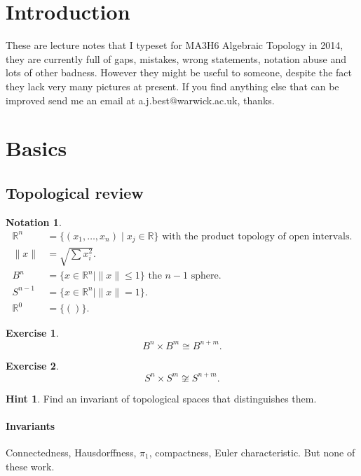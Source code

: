 \documentclass{article}
\theoremstyle{definition}
\newtheorem*{exer}{Exercise}
\newtheorem*{nota}{Notation}
\newtheorem*{hint}{Hint}
\newcommand{\RR}{\mathbb{R}}
\begin{document}
\maketitle
\tableofcontents

\section{Introduction}
These are lecture notes that I typeset for MA3H6 Algebraic Topology in 2014, they are currently full of gaps, mistakes, wrong statements, notation abuse and lots of other badness.
However they might be useful to someone, despite the fact they lack very many pictures at present.
If you find anything else that can be improved send me an email at a.j.best@warwick.ac.uk, thanks.
\clearpage

\section{Basics}
\subsection{Topological review}

\begin{nota}
\begin{align*}
\RR^n &= \{(x_1, \ldots,x_n)\mid x_j\in\RR\}\text{ with the product topology of open intervals}.\\
\|x\| &= \sqrt{\sum x_i^2}.\\
B^n &= \{x\in \RR^n \mid \|x\| \le 1\}\text{ the $n-1$ sphere}.\\
S^{n-1} &= \{x\in\RR^n\mid\|x\| = 1\}.\\
\RR^0 &= \{()\}.
\end{align*}
\end{nota}


\begin{exer}
\[B^n \times B^m \cong B^{n+m}.\]
\end{exer}

\begin{exer}
\[S^n \times S^m\not\cong S^{n+m}.\]
\end{exer}

\begin{hint}
Find an invariant of topological spaces that distinguishes them.
\end{hint}

\paragraph{Invariants}
Connectedness, Hausdorffness, $\pi_1$, compactness, Euler characteristic.
But none of these work.
\end{document}

